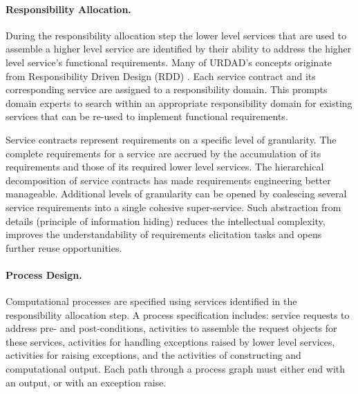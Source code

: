 \paragraph{Responsibility Allocation.} During the responsibility allocation step the lower level services that are used to assemble a higher level service are identified by their ability to address the higher level service's functional requirements. Many of URDAD's concepts originate from Responsibility Driven Design (RDD) \cite{wirfs-brock_object-oriented_1989,wirfs-brock_object_2002}. Each service contract and its corresponding service are assigned to a responsibility domain. This prompts domain experts to search within an appropriate responsibility domain for existing services that can be re-used to implement functional requirements.

Service contracts represent requirements on a specific level of granularity. The complete requirements for a service are accrued by the accumulation of its requirements and those of its required lower level services. The hierarchical decomposition of service contracts has made requirements engineering better manageable. Additional levels of granularity can be opened by coalescing several service requirements into a single cohesive super-service. Such abstraction from details (principle of information hiding) reduces the intellectual complexity, improves the understandability of requirements elicitation tasks and opens further reuse opportunities.

\paragraph{Process Design.} Computational processes are specified using services identified in the responsibility 
allocation step. A process specification includes: service requests to address pre- and post-conditions, activities 
to assemble the request objects for these services, activities for handling exceptions raised by lower level 
services, activities for raising exceptions, and the activities of constructing and computational output. Each path through a process graph must either end with an output, or with an exception raise.


